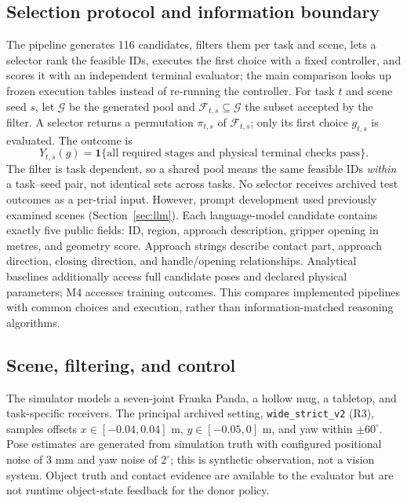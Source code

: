 \documentclass{article}
\newcommand{\code}[1]{\texttt{#1}}
\begin{document}
\subsection{Selection protocol and information boundary}
The pipeline generates 116 candidates, filters them per task and scene, lets a selector rank the feasible IDs, executes the first choice with a fixed controller, and scores it with an independent terminal evaluator; the main comparison looks up frozen execution tables instead of re-running the controller. For task $t$ and scene seed $s$, let $\mathcal G$ be the generated pool and $\mathcal F_{t,s}\subseteq\mathcal G$ the subset accepted by the filter. A selector returns a permutation $\pi_{t,s}$ of $\mathcal F_{t,s}$; only its first choice $g_{t,s}$ is evaluated. The outcome is
\begin{equation}
Y_{t,s}(g)=\mathbf{1}\{\text{all required stages and physical terminal checks pass}\}.
\end{equation}
The filter is task dependent, so a shared pool means the same feasible IDs \emph{within} a task--seed pair, not identical sets across tasks. No selector receives archived test outcomes as a per-trial input. However, prompt development used previously examined scenes (Section~\ref{sec:llm}).
Each language-model candidate contains exactly five public fields: ID, region, approach description, gripper opening in metres, and geometry score. Approach strings describe contact part, approach direction, closing direction, and handle/opening relationships. Analytical baselines additionally access full candidate poses and declared physical parameters; M4 accesses training outcomes. This compares implemented pipelines with common choices and execution, rather than information-matched reasoning algorithms.

\subsection{Scene, filtering, and control}
The simulator models a seven-joint Franka Panda, a hollow mug, a tabletop, and task-specific receivers. The principal archived setting, \code{wide\_strict\_v2} (R3), samples offsets $x\in[-0.04,0.04]$ m, $y\in[-0.05,0]$ m, and yaw within $\pm60^\circ$. Pose estimates are generated from simulation truth with configured positional noise of 3 mm and yaw noise of $2^\circ$; this is synthetic observation, not a vision system. Object truth and contact evidence are available to the evaluator but are not runtime object-state feedback for the donor policy.
\end{document}

